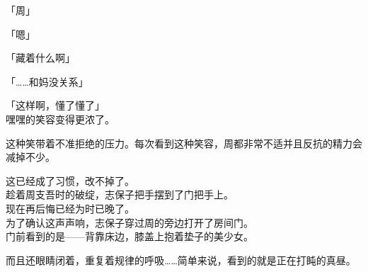 「周」

「嗯」

「藏着什么啊」

「……和妈没关系」

「这样啊，懂了懂了」\\

嘿嘿的笑容变得更浓了。

这种笑带着不准拒绝的压力。每次看到这种笑容，周都非常不适并且反抗的精力会减掉不少。

这已经成了习惯，改不掉了。\\

趁着周支吾时的破绽，志保子把手摆到了门把手上。\\

现在再后悔已经为时已晚了。\\

为了确认这声声响，志保子穿过周的旁边打开了房间门。\\

门前看到的是——背靠床边，膝盖上抱着垫子的美少女。

而且还眼睛闭着，重复着规律的呼吸……简单来说，看到的就是正在打盹的真昼。
